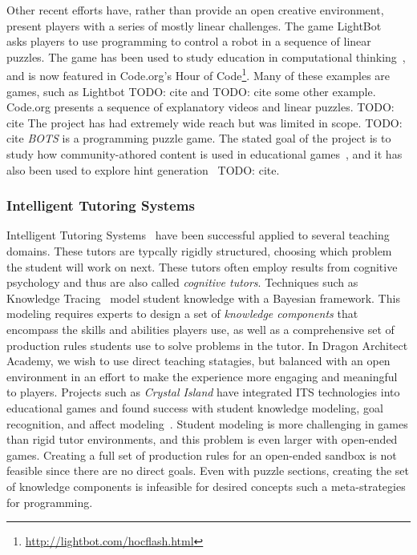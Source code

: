 \documentclass{sig-alternate}
\newcommand{\TODO}[1]{{\color{red} TODO: #1}}
\newcommand{\gametitle}{{\color{RoyalPurple} Dragon Architect Academy}}
\begin{document}
Other recent efforts have, rather than provide an open creative environment, present players with a series of mostly linear challenges.
The game LightBot~\cite{lightbot} asks players to use programming to control a robot in a sequence of linear puzzles. The game has been used to study education in computational thinking~\cite{Gouws13Lightbot}, and is now featured in Code.org's Hour of Code\footnote{\url{http://lightbot.com/hocflash.html}}.
Many of these examples are games, such as Lightbot \TODO{cite} and \TODO{cite some other example}.
Code.org presents a sequence of explanatory videos and linear puzzles. \TODO{cite}
The project has had extremely wide reach but was limited in scope. \TODO{cite}
\emph{BOTS} is a programming puzzle game. The stated goal of the project is to study how community-athored content is used in educational games~\cite{hickspart14}, and it has also been used to explore hint generation~\TODO{cite}.

\subsubsection{Intelligent Tutoring Systems}
Intelligent Tutoring Systems~\cite{koedinger06cognitive} have been successful applied to several teaching domains.
These tutors are typcally rigidly structured, choosing which problem the student will work on next.
These tutors often employ results from cognitive psychology and thus are also called \emph{cognitive tutors}.
Techniques such as Knowledge Tracing~\cite{corbett1994knowledge} model student knowledge with a Bayesian framework.
This modeling requires experts to design a set of \emph{knowledge components} that encompass the skills and abilities players use, as well as a comprehensive set of production rules students use to solve problems in the tutor.
In \gametitle{}, we wish to use direct teaching statagies, but balanced with an open environment in an effort to make the experience more engaging and meaningful to players.
Projects such as \emph{Crystal Island} have integrated ITS technologies into educational games and found success with student knowledge modeling, goal recognition, and affect modeling~\cite{lester2013serious,rowe2010modeling}.
Student modeling is more challenging in games than rigid tutor environments, and this problem is even larger with open-ended games.
Creating a full set of production rules for an open-ended sandbox is not feasible since there are no direct goals.
Even with puzzle sections, creating the set of knowledge components is infeasible for desired concepts such a meta-strategies for programming.
\end{document}
